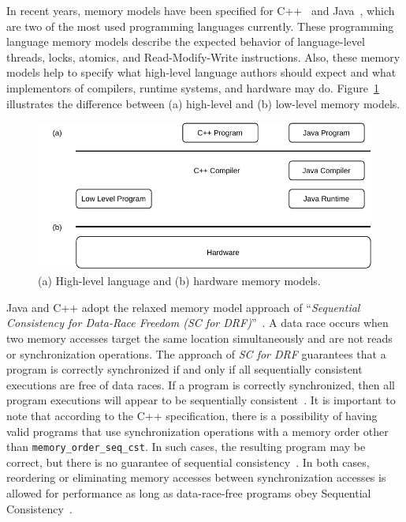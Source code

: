 In recent years, memory models have been specified for C++~\cite{DBLP_conf_pldi_BoehmA08} and Java~\cite{DBLP_conf_popl_MansonPA05}, which are two of the most used programming languages currently. These programming language memory models describe the expected behavior of language-level threads, locks, atomics, and Read-Modify-Write instructions. Also, these memory models help to specify what high-level language authors should expect and what implementors of compilers, runtime systems, and hardware may do. Figure~\ref{fig:memory-models} illustrates the difference between (a) high-level and (b) low-level memory models.

\begin{figure}[ht!]
    \centering
    \includegraphics[width=0.9\linewidth]{contents//figures/III_3_memory_model.pdf}
    \caption{(a) High-level language and (b) hardware memory models.}
    \label{fig:memory-models}
\end{figure}

Java and C++ adopt the relaxed memory model approach of ``\emph{Sequential Consistency for Data-Race Freedom (SC for DRF)}''~\cite{DBLP_conf_isca_AdveH90}.  A data race occurs when two memory accesses target the same location simultaneously and are not reads or synchronization operations. The approach of \emph{SC for DRF} guarantees that a program is correctly synchronized if and only if all sequentially consistent executions are free of data races. If a program is correctly synchronized, then all program executions will appear to be sequentially consistent~\cite{javamemorymodelspec}. It is important to note that according to the C++ specification, there is a possibility of having valid programs that use synchronization operations with a memory order other than \texttt{memory\_order\_seq\_cst}. In such cases, the resulting program may be correct, but there is no guarantee of sequential consistency~\cite{DBLP_conf_pldi_BoehmA08}. In both cases, reordering or eliminating memory accesses between synchronization accesses is allowed for performance as long as data-race-free programs obey Sequential Consistency~\cite{DBLP_series_synthesis_2020Nagarajan}.

